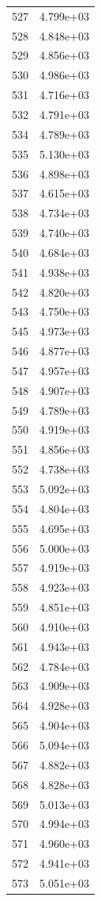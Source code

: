 \documentclass[12pt]{article}
\begin{document}
\begin{longtable}{@{}cc@{}}
527 & 4.799e+03 \\
528 & 4.848e+03 \\
529 & 4.856e+03 \\
530 & 4.986e+03 \\
531 & 4.716e+03 \\
532 & 4.791e+03 \\
534 & 4.789e+03 \\
535 & 5.130e+03 \\
536 & 4.898e+03 \\
537 & 4.615e+03 \\
538 & 4.734e+03 \\
539 & 4.740e+03 \\
540 & 4.684e+03 \\
541 & 4.938e+03 \\
542 & 4.820e+03 \\
543 & 4.750e+03 \\
545 & 4.973e+03 \\
546 & 4.877e+03 \\
547 & 4.957e+03 \\
548 & 4.907e+03 \\
549 & 4.789e+03 \\
550 & 4.919e+03 \\
551 & 4.856e+03 \\
552 & 4.738e+03 \\
553 & 5.092e+03 \\
554 & 4.804e+03 \\
555 & 4.695e+03 \\
556 & 5.000e+03 \\
557 & 4.919e+03 \\
558 & 4.923e+03 \\
559 & 4.851e+03 \\
560 & 4.910e+03 \\
561 & 4.943e+03 \\
562 & 4.784e+03 \\
563 & 4.909e+03 \\
564 & 4.928e+03 \\
565 & 4.904e+03 \\
566 & 5.094e+03 \\
567 & 4.882e+03 \\
568 & 4.828e+03 \\
569 & 5.013e+03 \\
570 & 4.994e+03 \\
571 & 4.960e+03 \\
572 & 4.941e+03 \\
573 & 5.051e+03 \\

\end{longtable}
\end{document}

